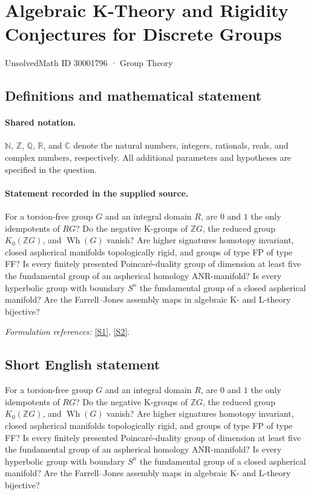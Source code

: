 \documentclass[11pt]{article}
\newcommand{\sref}[2]{\hyperlink{source:#1:#2}{[S#2]}}
\begin{document}
\setcounter{section}{30001795}
\section{Algebraic K-Theory and Rigidity Conjectures for Discrete Groups}\label{30001796}
{\small UnsolvedMath ID 30001796 · Group Theory}
\subsection{Definitions and mathematical statement}

\paragraph{Shared notation.}$\mathbb N$, $\mathbb Z$, $\mathbb Q$, $\mathbb R$, and $\mathbb C$ denote the natural numbers, integers, rationals, reals, and complex numbers, respectively. All additional parameters and hypotheses are specified in the question.


\paragraph{Statement recorded in the supplied source.}
For a torsion-free group $G$ and an integral domain $R$, are $0$ and $1$ the only idempotents of $RG$? Do the negative K-groups of $\mathbb{Z}G$, the reduced group $K_0(\mathbb{Z}G)$, and $\operatorname{Wh}(G)$ vanish? Are higher signatures homotopy invariant, closed aspherical manifolds topologically rigid, and groups of type FP of type FF? Is every finitely presented Poincaré-duality group of dimension at least five the fundamental group of an aspherical homology ANR-manifold? Is every hyperbolic group with boundary $S^n$ the fundamental group of a closed aspherical manifold? Are the Farrell–Jones assembly maps in algebraic K- and L-theory bijective?
\par\smallskip\textit{Formulation references:} \sref{30001796}{1}, \sref{30001796}{2}.
\subsection{Short English statement}
For a torsion-free group $G$ and an integral domain $R$, are $0$ and $1$ the only idempotents of $RG$? Do the negative K-groups of $\mathbb{Z}G$, the reduced group $K_0(\mathbb{Z}G)$, and $\operatorname{Wh}(G)$ vanish? Are higher signatures homotopy invariant, closed aspherical manifolds topologically rigid, and groups of type FP of type FF? Is every finitely presented Poincaré-duality group of dimension at least five the fundamental group of an aspherical homology ANR-manifold? Is every hyperbolic group with boundary $S^n$ the fundamental group of a closed aspherical manifold? Are the Farrell–Jones assembly maps in algebraic K- and L-theory bijective?
\end{document}

